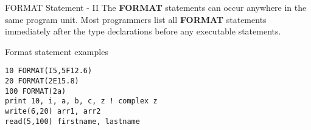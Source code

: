 \begin{frame}[fragile]{FORMAT Statement - II}
The \textbf{FORMAT} statements can occur anywhere in the same program
unit. Most programmers list all \textbf{FORMAT} statements immediately
after the type declarations before any executable statements.
\begin{block}{Format statement examples}
\begin{lstlisting}
10 FORMAT(I5,5F12.6)
20 FORMAT(2E15.8)
100 FORMAT(2a)
print 10, i, a, b, c, z ! complex z
write(6,20) arr1, arr2
read(5,100) firstname, lastname
\end{lstlisting}
\end{block}
\end{frame}